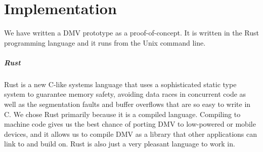 \chapter{Implementation}

We have written a DMV prototype as a proof-of-concept. It is written in the Rust
programming language and it runs from the Unix command line.


\paragraph{Rust}

Rust is a new C-like systems language that uses a sophisticated static type
system to guarantee memory safety, avoiding data races in concurrent code as
well as the segmentation faults and buffer overflows that are so easy to write
in C. We chose Rust primarily because it is a compiled language. Compiling to
machine code gives us the best chance of porting DMV to low-powered or mobile
devices, and it allows us to compile DMV as a library that other applications
can link to and build on. Rust is also just a very pleasant language to work in.






